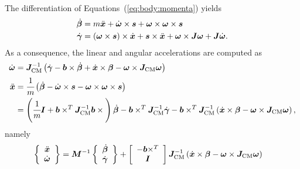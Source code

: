 \documentclass[10pt,fleqn,subeqn]{report}
\newcommand{\T}[1]{\bm{#1}}
\newcommand{\TT}[1]{\bm{#1}}
\begin{document}
The differentiation of Equations~(\ref{eq:body:momenta}) yields
\begin{subequations}
\begin{align}
	\dot{\T{\beta}}
	&=
	m \ddot{\T{x}}
	+
	\dot{\T{\omega}} \times \T{s}
	+
	\T{\omega} \times \T{\omega} \times \T{s}
	\\
	\dot{\T{\gamma}}
	&=
	\plbr{\T{\omega}\times \T{s}} \times \dot{\T{x}}
	+
	\T{s} \times \ddot{\T{x}}
	+
	\T{\omega} \times \TT{J} \T{\omega}
	+
	\TT{J} \dot{\T{\omega}} .
\end{align}
\end{subequations}
As a consequence, the linear and angular accelerations are computed as
\begin{align}
	\dot{\T{\omega}}
	&= \TT{J}_{\text{CM}}^{-1} \plbr{
		\dot{\T{\gamma}}
		- \T{b} \times \dot{\T{\beta}}
		+ \dot{\T{x}} \times \T{\beta}
		- \T{\omega} \times \TT{J}_{\text{CM}} \T{\omega}
	} \\
	\ddot{\T{x}}
	&= \cfrac{1}{m}\plbr{
		\dot{\T{\beta}}
		- \dot{\T{\omega}} \times \T{s}
		- \T{\omega} \times \T{\omega} \times \T{s}
	}
	\nonumber \\
	&= \plbr{
		\cfrac{1}{m} \TT{I}
		+
		\T{b}\times^T \TT{J}_\text{CM}^{-1} \T{b}\times{}
	} \dot{\T{\beta}}
	-
	\T{b}\times^T \TT{J}_\text{CM}^{-1} \dot{\T{\gamma}}
	-
	\T{b}\times^T \TT{J}_\text{CM}^{-1} \plbr{
		\dot{\T{x}}\times\T{\beta}
		- \T{\omega}\times\TT{J}_\text{CM} \T{\omega}
	}
	,
\end{align}
namely
\begin{align}
	\cubr{\cvvect{
		\ddot{\T{x}}
		\\
		\dot{\T{\omega}}
	}}
	&=
	\TT{M}^{-1} \cubr{\cvvect{
		\dot{\T{\beta}}
		\\
		\dot{\T{\gamma}}
	}}
	+
	\sqbr{\cvvect{
		- \T{b}\times^T
		\\
		\TT{I}
	}} \TT{J}_\text{CM}^{-1} \plbr{
		\dot{\T{x}}\times\T{\beta}
		-
		\T{\omega}\times\TT{J}_\text{CM} \T{\omega}
	}
\end{align}
\end{document}
